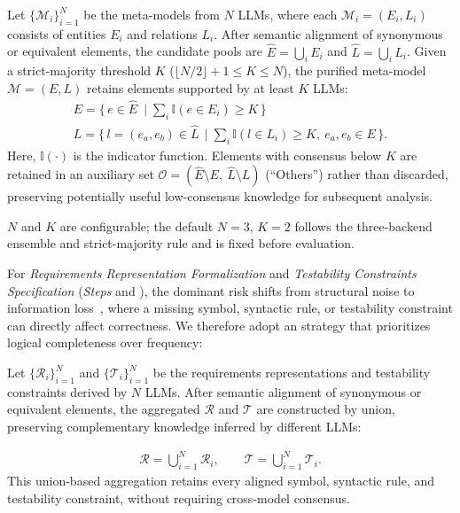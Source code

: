 \begin{tcolorbox}[colback=green!5!white, colframe=green!30!black, title={Definition: K-\strategymm}, fonttitle=\bfseries\small, fontupper=\small, rounded corners]
Let $\{\mathcal{M}_i\}_{i=1}^N$ be the meta-models from $N$ LLMs, where each $\mathcal{M}_i=(E_i,L_i)$ consists of entities $E_i$ and relations $L_i$. After semantic alignment of synonymous or equivalent elements, the candidate pools are $\widehat{E}=\bigcup_i E_i$ and $\widehat{L}=\bigcup_i L_i$. Given a strict-majority threshold $K$ ($\lfloor N/2\rfloor+1 \le K \le N$), the purified meta-model $\mathcal{M}=(E,L)$ retains elements supported by at least $K$ LLMs:
\begin{gather}
E = \big\{\, e\in\widehat{E} \ \;\big|\; \textstyle\sum_i \mathbb{I}(e\in E_i)\ge K \,\big\}\\
L = \big\{\, l=(e_a,e_b)\in\widehat{L}\ \ \big|\; \textstyle\sum_i \mathbb{I}(l\in L_i)\ge K,\ e_a,e_b\in E \,\big\}.
\end{gather}
Here, $\mathbb{I}(\cdot)$ is the indicator function. Elements with consensus below $K$ are retained in an auxiliary set $\mathcal{O}=(\widehat{E}\setminus E,\ \widehat{L}\setminus L)$ (``Others'') rather than discarded, preserving potentially useful low-consensus knowledge for subsequent analysis.
\end{tcolorbox}

$N$ and $K$ are configurable; the default $N=3$, $K=2$ follows the
three-backend ensemble and strict-majority rule and is fixed before evaluation.



For \textit{Requirements Representation Formalization} and \textit{Testability Constraints Specification} (\textit{Steps}  and ), the dominant risk shifts from structural noise to information loss~\cite{zowghi2003interplay}, where a missing symbol, syntactic rule, or testability constraint can directly affect correctness. We therefore adopt an \textit{\strategyrr} strategy that prioritizes logical completeness over frequency:


\begin{tcolorbox}[colback=blue!5!white, colframe=blue!30!black, title={Definition: \strategyrr}, fonttitle=\bfseries\small, fontupper=\small, rounded corners]

Let $\{\mathcal{R}_i\}_{i=1}^N$ and $\{\mathcal{T}_i\}_{i=1}^N$ be the requirements representations and testability constraints derived by $N$ LLMs. After semantic alignment of synonymous or equivalent elements, the aggregated $\mathcal{R}$ and $\mathcal{T}$ are constructed by union, preserving complementary knowledge inferred by different LLMs:

\begin{gather}
    \mathcal{R} = \bigcup\nolimits_{i=1}^N \mathcal{R}_i, \qquad
    \mathcal{T} = \bigcup\nolimits_{i=1}^N \mathcal{T}_i.
\end{gather}
This union-based aggregation retains every aligned symbol, syntactic rule, and testability constraint, without requiring cross-model consensus.
\end{tcolorbox}


